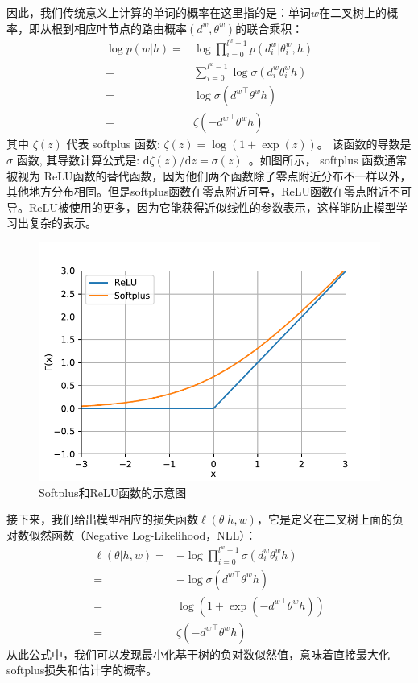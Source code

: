  因此，我们传统意义上计算的单词的概率在这里指的是：单词$ w $在二叉树上的概率，即从根到相应叶节点的路由概率$(d^w,\theta^w)$的联合乘积：
\begin{equation}\label{equ:pw}
\begin{split}
 \log p(w|h)=&\log\prod_{i=0}^{l^w-1} p(d^w_i|\theta_{i}^w,h) \\
 =& \sum_{i=0}^{l^w -1} \log\sigma(d_i^w \theta_{i}^w h)\\
 =&\log\sigma({d^w}^\top \theta^w h)\\
 =&\zeta(- {d^w}^\top \theta^w h )
 \end{split}
\end{equation}
其中 $\zeta(z)$ 代表 softplus 函数: $\zeta(z)= \log (1+\exp(z))$。 该函数的导数是 $\sigma$ 函数, 其导数计算公式是: ${\mathrm{d}\zeta(z)}/{\mathrm{d} z}= \sigma(z)$~。如图所示， softplus 函数通常被视为 ReLU函数的替代函数，因为他们两个函数除了零点附近分布不一样以外，其他地方分布相同。但是softplus函数在零点附近可导，ReLU函数在零点附近不可导。ReLU被使用的更多，因为它能获得近似线性的参数表示，这样能防止模型学习出复杂的表示。
\begin{figure}[!ht]
  \centering
\includegraphics[width=.8\linewidth]{./figures/relus.pdf}
\caption{Softplus和ReLU函数的示意图}\label{fig:soft}
\end{figure}

接下来，我们给出模型相应的损失函数$ \ell(\theta | h,w)$，它是定义在二叉树上面的负对数似然函数（Negative Log-Likelihood，NLL）：
\begin{equation}\label{equ:cost}
\begin{split}
   \ell(\theta|h,w) =&-\log\prod_{i=0}^{l^w -1} \sigma(d_i^w \theta_{i}^w h) \\
   =& -\log \sigma({d^w}^\top \theta^w h)\\
    =& \log (1+\exp(- {d^w}^\top \theta^w h )) \\
    =&  \zeta(- {d^w}^\top \theta^w h )
\end{split}
\end{equation}
从此公式中，我们可以发现最小化基于树的负对数似然值，意味着直接最大化softplus损失和估计字的概率。

